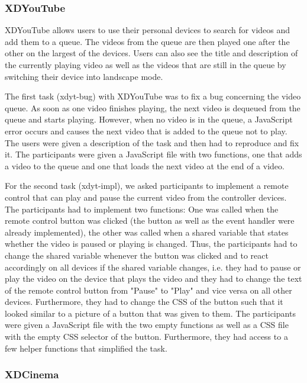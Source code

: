 \subsubsection{XDYouTube}
XDYouTube allows users to use their personal devices to search for videos and add them to a queue. The videos from the queue are then played one after the other on the largest of the devices. Users can also see the title and description of the currently playing video as well as the videos that are still in the queue by switching their device into landscape mode.

The first task (xdyt-bug) with XDYouTube was to fix a bug concerning the video queue. As soon as one video finishes playing, the next video is dequeued from the queue and starts playing. However, when no video is in the queue, a JavaScript error occurs and causes the next video that is added to the queue not to play. The users were given a description of the task and then had to reproduce and fix it.  The participants were given a JavaScript file with two functions, one that adds a video to the queue and one that loads the next video at the end of a video.

For the second task (xdyt-impl), we asked participants to implement a remote control that can play and pause the current video from the controller devices. The participants had to implement two functions: One was called when the remote control button was clicked (the button as well as the event handler were already implemented), the other was called when a shared variable that states whether the video is paused or playing is changed. Thus, the participants had to change the shared variable whenever the button was clicked and to react accordingly on all devices if the shared variable changes, i.e. they had to pause or play the video on the device that plays the video and they had to change the text of the remote control button from "Pause" to "Play" and vice versa on all other devices. Furthermore, they had to change the CSS of the button such that it looked similar to a picture of a button that was given to them. The participants were given a JavaScript file with the two empty functions as well as a CSS file with the empty CSS selector of the button. Furthermore, they had access to a few helper functions that simplified the task.

\subsubsection{XDCinema}

